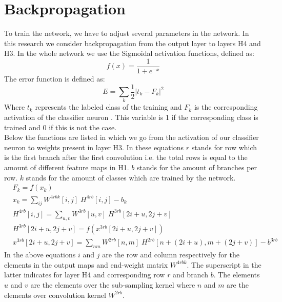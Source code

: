 \documentclass[a4paper,onecolumn]{report}
\begin{document}
\section{Backpropagation}
\label{sec:BP}
To train the network, we have to adjust several parameters in the network. In this research we consider backpropagation from the output layer to layers H4 and H3. In the whole network we use the Sigmoidal activation functions, defined as:
\begin{equation}
f(x)=\frac{1}{1+e^{-x}} 
\end{equation}	
The error function is defined as:
\begin{equation}
E=\sum_{k} \frac{1}{2}|t_k-F_{k}|^{2}
\end{equation}
Where $t_k$ represents the labeled class of the training and $F_{k}$ is the corresponding activation of the classifier neuron . This variable is 1 if the corresponding class is trained and 0 if this is not the case. \\

Below the functions are listed in which we go from the activation of our classifier neuron to weights present in layer H3. In these equations $r$ stands for row which is the first branch after the first convolution i.e. the total rows is equal to the amount of different feature maps in H1. $b$ stands for the amount of branches per row. $k$ stands for the amount of classes which are trained by the network.
\begin{equation}
\begin{split}
	&F_{k}= f( x_{k}) \\
	& x_{k}=\sum_{ij} W^{4rbk}[i,j] \; H^{4rb}[i,j] - b_{k} \\
	&H^{4rb}[i,j]= \sum_{u,v} W^{3rb}[u,v] \; H^{3rb} [2i+u,2j+v] \\
	&H^{3rb} [2i+u,2j+v]= f\left (x^{3rb}[2i+u,2j+v] \right) \\
	&x^{3rb}[2i+u,2j+v]=\sum_{nm} W^{2rb}[n,m] \; H^{2rb}[n+(2i+u),m+(2j+v)] -b^{3rb}
\end{split}
\end{equation}
In the above equations $i$ and $j$ are the row and column respectively for the elements in the output maps and end-weight matrix $ W^{4rbk}$. The superscript in the latter indicates for layer H4 and corresponding row $r$ and branch $b$. The elements $u$ and $v$ are the elements over the sub-sampling kernel where $n$ and $m$ are the elements over convolution kernel $W^{2rb}$.\\
\end{document}
